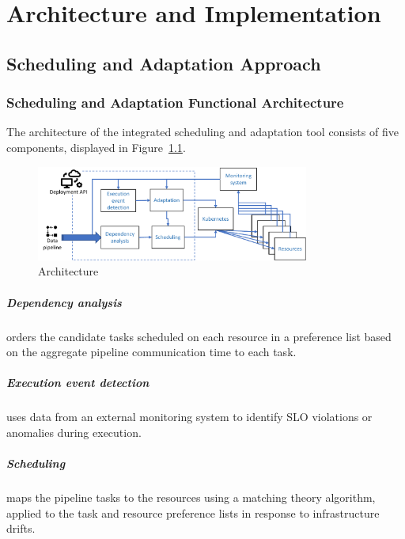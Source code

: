 \chapter{Architecture and Implementation}
\label{ch:architecture-and-implementation}

\section{Scheduling and Adaptation Approach}
\label{sec:scheduling-and-adaptation-approach-architecture}

  \subsection{Scheduling and Adaptation Functional Architecture}
  The architecture of the integrated \SAA{} scheduling and adaptation tool consists of five components, displayed in Figure~\ref{fig:data-cloud-architecture}.

  \begin{figure}
      \centering
      \includegraphics[width=0.8\textwidth]{pdf/data_cloud_arch.pdf}
      \caption{\SAA Architecture}
      \label{fig:data-cloud-architecture}
  \end{figure}

  \paragraph{Dependency analysis } orders the candidate tasks scheduled on each resource in a preference list based on the aggregate pipeline communication time to each task.

  \paragraph{Execution event detection } uses data from an external monitoring system to identify SLO violations or anomalies during execution.

  \paragraph{Scheduling } maps the pipeline tasks to the resources using a matching theory algorithm, applied to the task and resource preference lists in response to infrastructure drifts.

